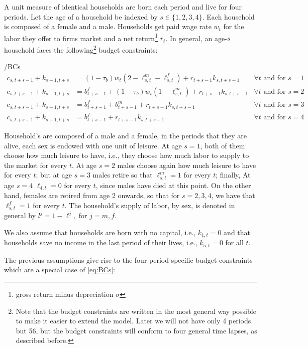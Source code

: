 \documentclass[ProjectUYA]{subfiles}
\begin{document}
 A unit measure of identical households are born each period and live for four periods. Let the age of a household be indexed by $s\in\{1,2,3,4\}.$ Each household is composed of a female and a male. Households get paid wage rate $w_t$ for the labor they offer to firms market and a net return\footnote{gross return minus depreciation $\sigma$} $r_t$. In general, an age-$s$ household
 faces the following\footnote{Note that the budget constraints are written in the most general way possible to make it easier to extend the model. Later we will not have only 4 periods but 56, but the budget constraints will conform to four general time lapses, as described before. } budget constraints:
 \begin{verbatimwrite}{\EqDir/BCs}
	\label{eq:BCs}
 	 \begin{align}
 	c_{s,t+s-1} + k_{s+1,t+s} &= (1-\tau_b)w_t (2-\ell_{s,t}^m - \ell_{s,t}^f) + r_{t+s-1}k_{s,t+s-1} & \forall t\text{ and for $s=1$} \\
 	c_{s,t+s-1} + k_{s+1,t+s} &= b_{t+s-1}^f+(1-\tau_b)w_t (1-\ell_{s,t}^m ) + r_{t+s-1}k_{s,t+s-1} & \forall t\text{ and for $s=2$} \\
 	c_{s,t+s-1} + k_{s+1,t+s} &= b_{t+s-1}^f+ b_{t+s-1}^m  + r_{t+s-1}k_{s,t+s-1} & \forall t\text{ and for $s=3$} \\
 	c_{s,t+s-1} + k_{s+1,t+s} &= b_{t+s-1}^f + r_{t+s-1}k_{s,t+s-1} & \forall t\text{ and for $s=4$} 
 \end{align}
\end{verbatimwrite}


Household's are composed of a male and a female, in the periods that they are alive, each sex is endowed with one unit of leisure. At age $s=1$, both of them choose how much leisure to have, i.e., they choose how much labor to supply to the market for every $t$. At age $s=2$ males choose again how much leisure to have for every $t$; but at age $s=3$ males retire so that  $\ell_{s,t}^m=1$ for every $t$; finally,  At age $s=4$ $\ell_{4,t}=0$ for every $t$, since males have died at this point. On the other hand, females are retired from age 2 onwards, so that for $s=2,3,4$, we have that $\ell_{s,t}^f=1$ for every $t.$ The household's supply of labor, by sex, is denoted in general by $l^j=1-\ell^j,$ for $j=m,f.$

 We also assume that households are born with no capital, i.e., $k_{1,t}=0$ and that households save no income in the last period of their lives, i.e., $k_{5,t}=0$ for all $t.$

 The previous assumptions give rise to the four period-specific budget constraints which are a special case of \eqref{eq:BCs}:
\end{document}

